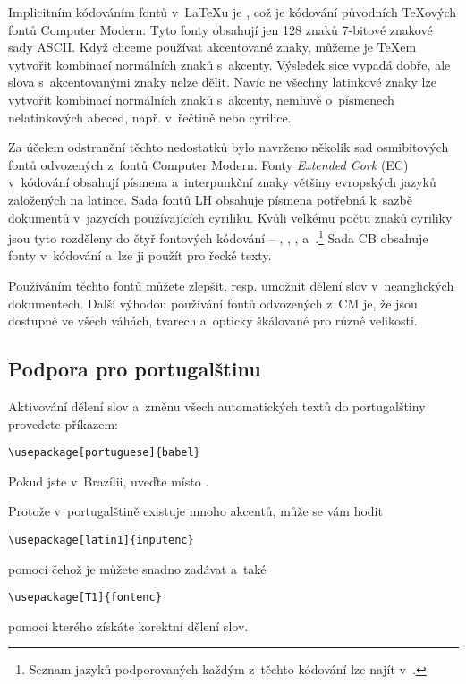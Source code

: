 Implicitním kódováním fontů v~\LaTeX u je \label{OT1}, což je kódování
původních \TeX o\-vých fontů Computer Modern. Tyto fonty obsahují jen 128 znaků
7-bitové znakové sady ASCII. Když chceme používat akcentované znaky, můžeme
je \TeX em vytvořit kombinací normálních znaků s~akcenty. Výsledek sice vypadá
dobře, ale slova s~akcentovanými znaky nelze dělit. Navíc ne všechny latinkové
znaky lze vytvořit kombinací normálních znaků s~akcenty, nemluvě o~písmenech
nelatinkových abeced, např. v~řečtině nebo cyrilice.

Za účelem odstranění těchto nedostatků bylo navrženo několik sad osmibitových
fontů odvozených z~fontů Computer Modern. Fonty \emph{Extended Cork} (EC)
v~kódování  obsahují písmena a~interpunkční znaky většiny evropských
jazyků založených na latince. Sada fontů LH obsahuje písmena potřebná k~sazbě
dokumentů v~jazycích používajících cyriliku. Kvůli velkému počtu znaků
cyriliky jsou tyto rozděleny do čtyř fontových kódování -- , ,
, a~.\footnote{Seznam jazyků podporovaných každým z~těchto
kódování lze najít v~\cite{cyrguide}.} Sada CB obsahuje fonty v~kódování
 a~lze ji použít pro řecké texty.

Používáním těchto fontů můžete zlepšit, resp. umožnit dělení slov v~neanglických
dokumentech. Další výhodou používání fontů odvozených z~CM je, že 
jsou dostupné ve všech váhách, tvarech a~opticky škálované pro různé velikosti.

\subsection{Podpora pro portugalštinu}

Aktivování dělení slov a~změnu všech automatických textů do portugalštiny
 provedete příkazem:
\begin{lscommand}
\verb|\usepackage[portuguese]{babel}|
\end{lscommand}
Pokud jste v~Brazílii, uveďte \texttt{} místo \texttt{}.

Protože v~portugalštině existuje mnoho akcentů, může se vám hodit
\begin{lscommand}
\verb|\usepackage[latin1]{inputenc}|
\end{lscommand}
pomocí čehož je můžete snadno zadávat a~také
\begin{lscommand}
\verb|\usepackage[T1]{fontenc}|
\end{lscommand}
pomocí kterého získáte korektní dělení slov.


